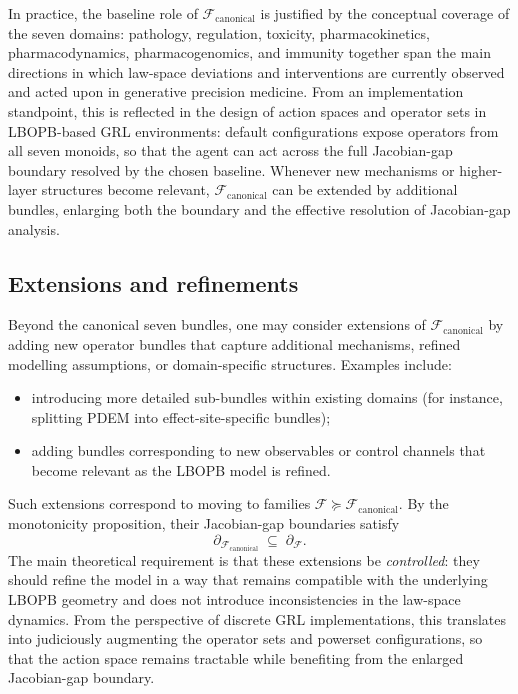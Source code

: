 \documentclass[11pt]{book}
\theoremstyle{plain}
\theoremstyle{definition}
\theoremstyle{remark}
\begin{document}
In practice, the baseline role of $\mathcal{F}_{\mathrm{canonical}}$ is
justified by the conceptual coverage of the seven domains: pathology,
regulation, toxicity, pharmacokinetics, pharmacodynamics,
pharmacogenomics, and immunity together span the main directions in
which law-space deviations and interventions are currently observed and
acted upon in generative precision medicine.
From an implementation standpoint, this is reflected in the design of
action spaces and operator sets in LBOPB-based GRL environments:
default configurations expose operators from all seven monoids, so that
the agent can act across the full Jacobian-gap boundary resolved by
the chosen baseline.
Whenever new mechanisms or higher-layer structures become relevant,
$\mathcal{F}_{\mathrm{canonical}}$ can be extended by additional
bundles, enlarging both the boundary and the effective resolution of
Jacobian-gap analysis.

\subsection*{Extensions and refinements}

Beyond the canonical seven bundles, one may consider extensions of
$\mathcal{F}_{\mathrm{canonical}}$ by adding new operator bundles that
capture additional mechanisms, refined modelling assumptions, or
domain-specific structures. Examples include:

\begin{itemize}
  \item introducing more detailed sub-bundles within existing domains
        (for instance, splitting PDEM into effect-site-specific bundles);
  \item adding bundles corresponding to new observables or control
        channels that become relevant as the LBOPB model is refined.
\end{itemize}

Such extensions correspond to moving to families
$\mathcal{F} \succeq \mathcal{F}_{\mathrm{canonical}}$. By the
monotonicity proposition, their Jacobian-gap boundaries satisfy
\[
  \partial_{\mathcal{F}_{\mathrm{canonical}}}
  \;\subseteq\;
  \partial_{\mathcal{F}}.
\]
The main theoretical requirement is that these extensions be
\emph{controlled}: they should refine the model in a way that remains
compatible with the underlying LBOPB geometry and does not introduce
inconsistencies in the law-space dynamics. From the perspective of
discrete GRL implementations, this translates into judiciously
augmenting the operator sets and powerset configurations, so that the
action space remains tractable while benefiting from the enlarged
Jacobian-gap boundary.
\end{document}

